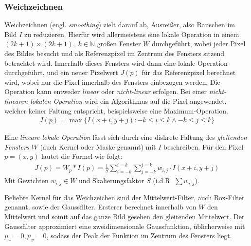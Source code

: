 
\subsubsection*{Weichzeichnen}
Weichzeichnen (engl. \textit{smoothing}) zielt darauf ab, \dq Ausreißer\dq, also Rauschen im Bild $I$ zu reduzieren\cite{Klette14}. Hierfür wird allermeistens eine lokale Operation in einem
$(2k+1) \times (2k+1), \; k \in \mathbb{N} $ großen Fenster $W$ durchgeführt, wobei jeder Pixel des Bildes besucht und als Referenzpixel im Zentrum des Fensters
sitzend betrachtet wird. Innerhalb dieses Fensters wird dann eine lokale Operation durchgeführt, und ein neuer Pixelwert $J(p)$ für das Referenzpixel berechnet wird, 
wobei nur die Pixel innerhalb des Fensters einbezogen werden. Die Operation kann entweder \textit{linear} oder \textit{nicht-linear} erfolgen. 
Bei einer \textit{nicht-linearen lokalen Operation} wird ein Algorithmus auf die Pixel angewendet, welcher keiner Faltung entspricht, beispielsweise eine Maximum-Operation\cite[S.\. 46]{Klette14}.
\begin{align}
    J(p) = \max\{I(x+i, y+j): -k \le i \le k \wedge -k \le j \le k\}
\end{align}

Eine \textit{lineare lokale Operation} lässt sich durch eine diskrete Faltung des \textit{gleitenden Fensters} $W$ (auch Kernel oder Maske genannt) mit $I$ beschreiben. Für den Pixel $p = (x,y)$ lautet die Formel
wie folgt: 
\begin{align}
    J(p) = W_p \ast I(p) = \frac{1}{S} \sum_{i=-k}^{i=k}\sum_{j=-k}^{j=k} w_{i,j} \cdot I(x+i, y+j)
\end{align}
Mit Gewichten $w_{i,j} \in W$ und Skalierungsfaktor $S$ (i.d.R. $\sum w_{i,j}$)\cite[S.\. 47]{Klette14}.

Beliebte Kernel für das Weichzeichen sind der Mittelwert-Filter, auch Box-Filter genannt, sowie der Gaussfilter. Ersterer berechnet innerhalb von $W$ den Mittelwert und somit auf das ganze Bild gesehen
den gleitenden Mittelwert. Der Gaussfilter approximiert eine zweidimensionale Gaussfunktion, üblicherweise mit $\mu_x = 0, \mu_y = 0$, sodass der Peak der Funktion im Zentrum des Fensters liegt\cite[S.\. 57f.]{Klette14}.


